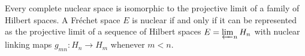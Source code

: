 Every complete nuclear space is isomorphic to the projective limit of a family of Hilbert spaces. A Fréchet space $E$ is nuclear if and only if it can be represented as the projective limit of a sequence of Hilbert spaces $E = \varprojlim_n H_n$ with nuclear linking maps $g_{mn}: H_n \to H_m$ whenever $m < n$.
